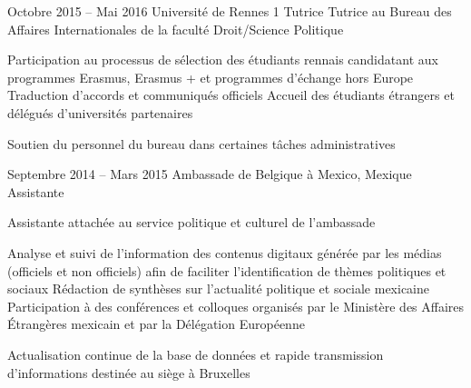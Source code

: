 \documentclass[30pt]{tccv}
\begin{document}
\begin{upshape}
\begin{experience}
\vspace{0.5cm}
\item{\color{text} Octobre 2015 -- Mai 2016}
     {Université de Rennes 1}
     {Tutrice}
     \fontsize{10pt}{1.1em}\color{text}\bodyfontlight\upshape\selectfont
{} Tutrice au Bureau des Affaires Internationales de la faculté Droit/Science Politique \\
\sloppy
{}%
    \setlength{\parskip}{-10pt}
    \begin{itemize}
      \cvitem[\checkmark] Participation au processus de sélection des étudiants rennais candidatant aux programmes Erasmus, Erasmus + et pro\-grammes d’échange hors Europe
      \cvitem[\checkmark] Traduction d’accords et communiqués officiels
      \cvitem[\checkmark] Accueil des étudiants étrangers et délégués d’uni\-ver\-sités par\-tenaires
    \end{itemize}     
 Soutien du personnel du bureau dans certaines tâches administratives 





\vspace{1.5cm}
\item{Septembre 2014 -- Mars 2015}
     {Ambassade de Belgique à Mexico, Mexique}
     {Assistante}
     \fontsize{10pt}{1.1em}\color{text}\bodyfontlight\upshape\selectfont

 Assistante attachée au service politique et culturel de l’ambassade \\
    \setlength{\parskip}{-10pt}
    \begin{itemize}
      \cvitem[\checkmark] Analyse et suivi de l’information des contenus digitaux générée par les médias (officiels et non officiels) afin de faciliter l’identification de thèmes politiques et sociaux 
      \cvitem[\checkmark] Rédaction de synthèses sur l’actualité politique et sociale mexicaine
      \cvitem[\checkmark] Participation à des conférences et colloques organisés par le Ministère des Affaires Étrangères mexicain et par la Délégation Européenne
    \end{itemize}     
 Actualisation continue de la base de données et rapide transmission d’informations destinée au siège à Bruxelles 



\end{experience}
\end{upshape}
\end{document}
